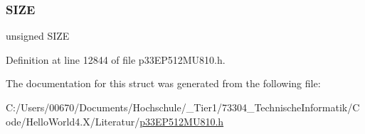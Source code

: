 \subsubsection{\texorpdfstring{S\+I\+ZE}{SIZE}}
{\footnotesize\ttfamily unsigned S\+I\+ZE}



Definition at line 12844 of file p33\+E\+P512\+M\+U810.\+h.



The documentation for this struct was generated from the following file\+:\begin{DoxyCompactItemize}
\item 
C\+:/\+Users/00670/\+Documents/\+Hochschule/\+\_\+\+Tier1/73304\+\_\+\+Technische\+Informatik/\+Code/\+Hello\+World4.\+X/\+Literatur/\hyperlink{p33_e_p512_m_u810_8h}{p33\+E\+P512\+M\+U810.\+h}\end{DoxyCompactItemize}
